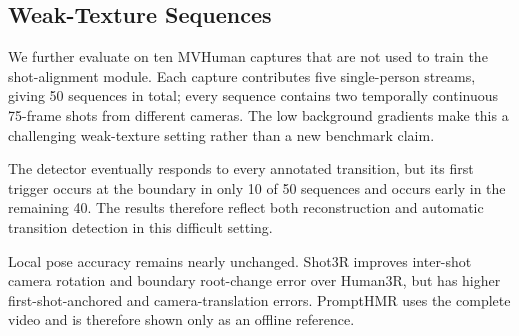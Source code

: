 \FloatBarrier
\subsection{Weak-Texture Sequences}
\label{app:mvhuman-stress}

We further evaluate on ten MVHuman captures that are not used to train the
shot-alignment module. Each capture contributes five single-person streams, giving
50 sequences in total; every sequence contains two temporally continuous
75-frame shots from different cameras. The low background gradients make
this a challenging weak-texture setting rather than a new benchmark claim.

The detector eventually responds to every annotated transition, but its first
trigger occurs at the boundary in only 10 of 50 sequences and occurs early in
the remaining 40. The results therefore reflect both reconstruction and automatic
transition detection in this difficult setting.

Local pose accuracy remains nearly unchanged. Shot3R improves inter-shot camera
rotation and boundary root-change error over Human3R, but has higher
first-shot-anchored and camera-translation errors. PromptHMR uses the complete
video and is therefore shown only as an offline reference.

\begin{table}[t]
  \centering
  \caption{Results on 50 weak-texture MVHuman sequences. Boundary root $\Delta$
  measures error in the predicted root-position change across the transition.
  Human errors are in mm, camera rotation in degrees, camera translation in m, and Coverage in
  percent. Parentheses give the number of OnlineHMR sequences with evaluable
  boundary metrics.}
  \label{tab:mvhuman-heldout}
  \small
  \resizebox{0.95\textwidth}{!}{}
\end{table}

